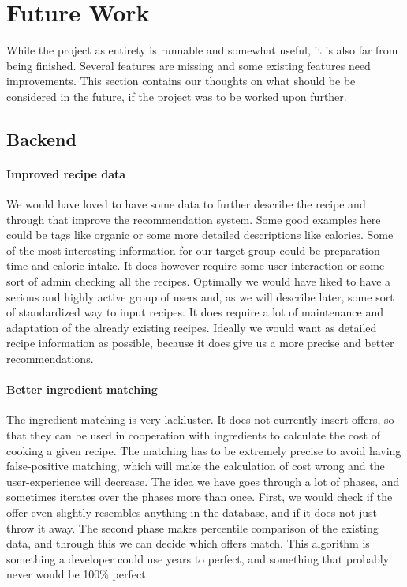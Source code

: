 \section{Future Work}
\label{sec:future}

While the project as entirety is runnable and somewhat useful, it is also far from being finished. Several features are missing and some existing features need improvements. This section contains our thoughts on what should be be considered in the future, if the project was to be worked upon further.

\subsection{Backend}

\paragraph{Improved recipe data} 
We would have loved to have some data to further describe the recipe and through that improve the recommendation system. Some good examples here could be tags like organic or some more detailed descriptions like calories. Some of the most interesting information for our target group could be preparation time and calorie intake. It does however require some user interaction or some sort of admin checking all the recipes. Optimally we would have liked to have a serious and highly active group of users and, as we will describe later, some sort of standardized way to input recipes. It does require a lot of maintenance and adaptation of the already existing recipes. Ideally we would want as detailed recipe information as possible, because it does give us a more precise and better recommendations.

\paragraph{Better ingredient matching}
The ingredient matching is very lackluster. It does not currently insert offers, so that they can be used in cooperation with ingredients to calculate the cost of cooking a given recipe. The matching has to be extremely precise to avoid having false-positive matching, which will make the calculation of cost wrong and the user-experience will decrease. 
The idea we have goes through a lot of phases, and sometimes iterates over the phases more than once. First, we would check if the offer even slightly resembles anything in the database, and if it does not just throw it away. The second phase makes percentile comparison of the existing data, and through this we can decide which offers match. This algorithm is something a developer could use years to perfect, and something that probably never would be 100\% perfect.

